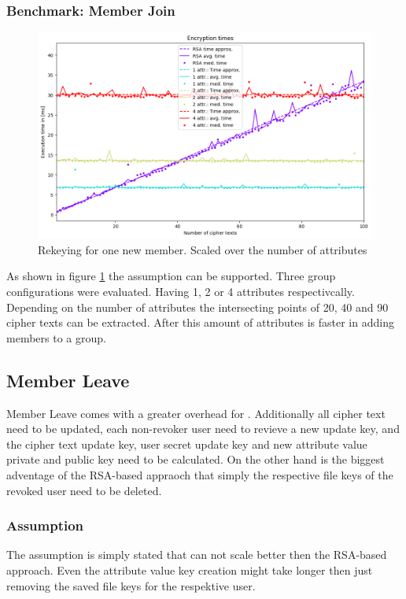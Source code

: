 \subsubsection{Benchmark: Member Join}
\begin{figure}[!ht]
\centering
    \includegraphics[width=\linewidth]{img/eval-join/join_attr_1.png}
    \caption{Rekeying for one new member. Scaled over the number of attributes}
    \label{fig:member-join}
\end{figure}

As shown in figure \ref{fig:member-join} the assumption can be supported. Three group configurations were evaluated. Having 1, 2 or 4 attributes respectivcally. Depending on the number of attributes the intersecting points of 20, 40 and 90 cipher texts can be extracted. After this amount of attributes \name is faster in adding members to a group. 

\subsection{Member Leave}
Member Leave comes with a greater overhead for \name. Additionally all cipher text need to be updated, each non-revoker user need to revieve a new update key, and the cipher text update key, user secret update key and new attribute value private and public key need to be calculated. On the other hand is the biggest adventage of the RSA-based appraoch that simply the respective file keys of the revoked user need to be deleted.

\subsubsection{Assumption}
The assumption is simply stated that \name can not scale better then the RSA-based approach. Even the attribute value key creation might take longer then just removing the saved file keys for the respektive user. 

